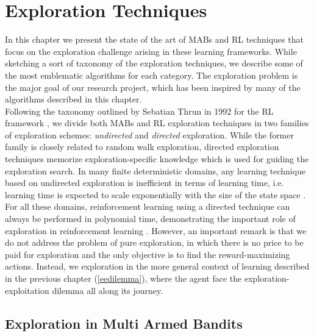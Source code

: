 
\chapter{Exploration Techniques}

In this chapter we present the state of the art of \gls{MAB}s and \gls{RL} techniques that focus on the exploration challenge arising in these learning frameworks. While sketching a sort of taxonomy of the exploration techniques, we describe some of the most emblematic algorithms for each category. The exploration problem is the major goal of our research project, which has been inspired by many of the algorithms described in this chapter. \\
Following the taxonomy outlined by Sebatian Thrun in 1992 for the \gls{RL} framework  \cite{thrun1992efficient}, we divide both \gls{MAB}s and \gls{RL} exploration techniques in two families of exploration schemes: \emph{undirected} and \emph{directed} exploration.
While the former family is closely related to random walk exploration, directed exploration techniques memorize exploration-specific knowledge which is used for guiding the exploration search. In many finite deterministic domains, any learning technique based on undirected exploration is inefficient in terms of learning time, i.e. learning time is expected to scale exponentially with the size of the state space \cite{whitehead1991study}. For all these domains, reinforcement learning using a directed technique can always be performed in polynomial time, demonstrating the important role of exploration in reinforcement learning \cite{thrun1992efficient}. However, an important remark is that we do not address the problem of pure exploration, in which there is no price to be paid for exploration and the only objective is to find the reward-maximizing actions. Instead, we  exploration in the more general context of learning described in the previous chapter (\ref{eedilemma}), where the agent face the exploration-exploitation dilemma all along its journey. 

\section{Exploration in Multi Armed Bandits}

